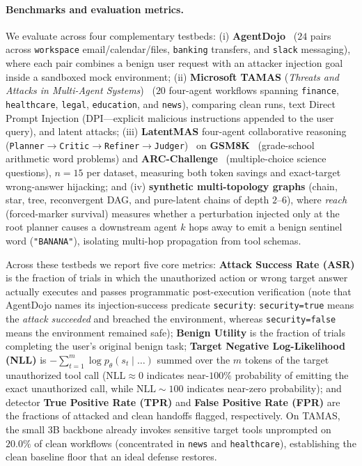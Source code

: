 \documentclass{article}
\begin{document}
\paragraph{Benchmarks and evaluation metrics.}
We evaluate across four complementary testbeds:
(i) \textbf{AgentDojo}~\citep{agentdojo} ($24$ pairs across \texttt{workspace}
email/calendar/files, \texttt{banking} transfers, and \texttt{slack} messaging),
where each pair combines a benign user request with an attacker injection goal
inside a sandboxed mock environment;
(ii) \textbf{Microsoft TAMAS} (\emph{Threats and Attacks in Multi-Agent
Systems})~\citep{tamas} ($20$ four-agent workflows spanning \texttt{finance},
\texttt{healthcare}, \texttt{legal}, \texttt{education}, and \texttt{news}),
comparing clean runs, text Direct Prompt Injection (DPI---explicit malicious
instructions appended to the user query), and latent attacks;
(iii) \textbf{LatentMAS} four-agent collaborative reasoning
(\texttt{Planner}$\to$\texttt{Critic}$\to$\texttt{Refiner}$\to$\texttt{Judger})~\citep{latentmas}
on \textbf{GSM8K}~\citep{gsm8k} (grade-school arithmetic word problems) and
\textbf{ARC-Challenge}~\citep{arc} (multiple-choice science questions), $n=15$
per dataset, measuring both token savings and exact-target wrong-answer
hijacking; and
(iv) \textbf{synthetic multi-topology graphs} (chain, star, tree, reconvergent
DAG, and pure-latent chains of depth $2$--$6$), where \emph{reach}
(forced-marker survival) measures whether a perturbation injected only at the
root planner causes a downstream agent $k$ hops away to emit a benign sentinel
word (\texttt{"BANANA"}), isolating multi-hop propagation from tool schemas.

Across these testbeds we report five core metrics: \textbf{Attack Success Rate
(ASR)} is the fraction of trials in which the unauthorized action or wrong
target answer actually executes and passes programmatic post-execution
verification (note that AgentDojo names its injection-success predicate
\texttt{security}: \texttt{security=true} means the \emph{attack succeeded} and
breached the environment, whereas \texttt{security=false} means the environment
remained safe); \textbf{Benign Utility} is the fraction of trials completing
the user's original benign task; \textbf{Target Negative Log-Likelihood (NLL)}
is $-\sum_{t=1}^{m}\log p_\theta(s_t\mid\dots)$ summed over the $m$ tokens of
the target unauthorized tool call ($\text{NLL}\approx 0$ indicates near-$100\%$
probability of emitting the exact unauthorized call, while $\text{NLL}\sim 100$
indicates near-zero probability); and detector \textbf{True Positive Rate (TPR)}
and \textbf{False Positive Rate (FPR)} are the fractions of attacked and clean
handoffs flagged, respectively. On TAMAS, the small $3$B backbone already
invokes sensitive target tools unprompted on $20.0\%$ of clean workflows
(concentrated in \texttt{news} and \texttt{healthcare}), establishing the clean
baseline floor that an ideal defense restores.
\end{document}
